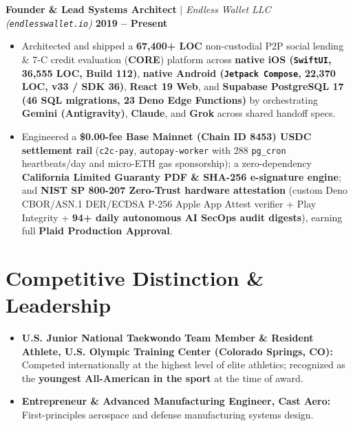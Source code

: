 \documentclass[10pt,letterpaper]{article}
\begin{document}
\textbf{Founder \& Lead Systems Architect} $|$ \textit{Endless Wallet LLC (\texttt{endlesswallet.io})} \hfill \textbf{2019 -- Present}
\begin{itemize}
    \item Architected and shipped a \textbf{67,400+ LOC} non-custodial P2P social lending \& 7-C credit evaluation (\textbf{CORE}) platform across \textbf{native iOS (\texttt{SwiftUI}, 36,555 LOC, Build 112)}, \textbf{native Android (\texttt{Jetpack Compose}, 22,370 LOC, v33 / SDK 36)}, \textbf{React 19 Web}, and \textbf{Supabase PostgreSQL 17 (46 SQL migrations, 23 Deno Edge Functions)} by orchestrating \textbf{Gemini (Antigravity)}, \textbf{Claude}, and \textbf{Grok} across shared handoff specs.
    \item Engineered a \textbf{\$0.00-fee Base Mainnet (Chain ID 8453) USDC settlement rail} (\texttt{c2c-pay}, \texttt{autopay-worker} with 288 \texttt{pg\_cron} heartbeats/day and micro-ETH gas sponsorship); a zero-dependency \textbf{California Limited Guaranty PDF \& SHA-256 e-signature engine}; and \textbf{NIST SP 800-207 Zero-Trust hardware attestation} (custom Deno CBOR/ASN.1 DER/ECDSA P-256 Apple App Attest verifier + Play Integrity + \textbf{94+ daily autonomous AI SecOps audit digests}), earning full \textbf{Plaid Production Approval}.
\end{itemize}

\section{Competitive Distinction \& Leadership}
\begin{itemize}
    \item \textbf{U.S. Junior National Taekwondo Team Member \& Resident Athlete, U.S. Olympic Training Center (Colorado Springs, CO):} Competed internationally at the highest level of elite athletics; recognized as the \textbf{youngest All-American in the sport} at the time of award.
    \item \textbf{Entrepreneur \& Advanced Manufacturing Engineer, Cast Aero:} First-principles aerospace and defense manufacturing systems design.
\end{itemize}
\end{document}
